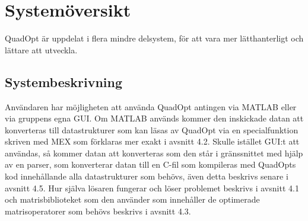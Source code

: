 \newpage
\section{Systemöversikt}
QuadOpt är uppdelat i flera mindre delsystem, för att vara mer lätthanterligt och lättare att utveckla.

\subsection{Systembeskrivning}


Användaren har möjligheten att använda QuadOpt antingen via MATLAB eller via gruppens egna GUI. Om MATLAB används kommer den inskickade datan att konverteras till datastrukturer som kan läsas av QuadOpt via en specialfunktion skriven med MEX som förklaras mer exakt i avsnitt 4.2. Skulle istället GUI:t att användas, så kommer datan att konverteras som den står i gränssnittet med hjälp av en parser, som konverterar datan till en C-fil som kompileras med QuadOpts kod innehållande alla datastrukturer som behövs, även detta beskrivs senare i avsnitt 4.5. Hur själva lösaren fungerar och löser problemet beskrivs i avsnitt 4.1 och matrisbiblioteket som den använder som innehåller de optimerade matrisoperatorer som behövs beskrivs i avsnitt 4.3.

